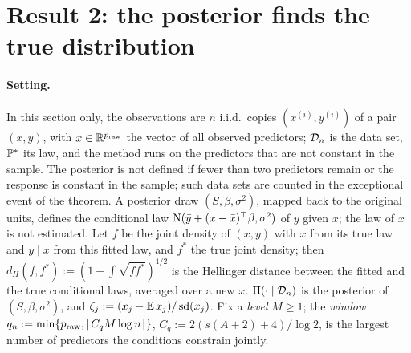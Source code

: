 \section{Result 2: the posterior finds the true distribution}\label{sec:distribution}



\paragraph{Setting.} In this section only, the observations are $n$ i.i.d.\ copies $(x^{(i)},y^{(i)})$ of a pair $(x,y)$,
with $x\in\R^{\praw}$ the vector of all observed predictors; $\Dn$ is the data set, $\P^*$ its law, and the method runs on
the predictors that are not constant in the sample. The posterior is not defined if fewer than two predictors remain or
the response is constant in the sample; such data sets are counted in the exceptional event of the theorem. A posterior draw $(S,\beta,\sigma^2)$, mapped back to the original
units, defines the conditional law $\Normal(\bar y+(x-\bar x)^\top\beta,\sigma^2)$ of $y$ given $x$; the law of $x$ is not
estimated. Let $f$ be the joint density of $(x,y)$ with $x$ from its true law and $y\mid x$ from this fitted law, and $f^*$
the true joint density; then $d_H(f,f^*):=(1-\int\sqrt{ff^*})^{1/2}$ is the Hellinger distance between the fitted and the true conditional
laws, averaged over a new $x$. $\Pi(\cdot\mid\Dn)$ is the posterior of $(S,\beta,\sigma^2)$, and
$\zeta_j:=(x_j-\E x_j)/\sd(x_j)$. Fix a \emph{level} $M\ge1$; the \emph{window} $q_n:=\min\{\praw,\lceil C_qM\log
n\rceil\}$, $C_q:=2(s(A+2)+4)/\log2$, is the largest number of predictors the conditions constrain jointly.

